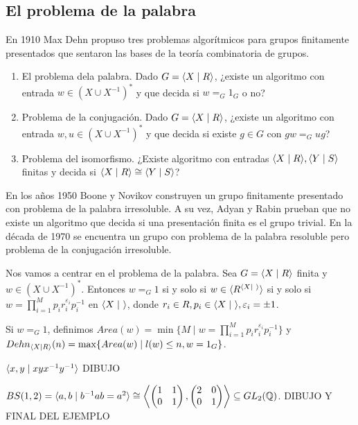 \documentclass[twoside, 11pt]{article}
\begin{document}
\subsection{El problema de la palabra}
En 1910 Max Dehn propuso tres problemas algorítmicos para grupos finitamente presentados que sentaron las bases de la teoría combinatoria de grupos. 
\begin{enumerate}
\item El problema dela palabra. Dado $G=\langle{X\mid R}\rangle$, ¿existe un algoritmo con entrada $w\in (X\cup X^{-1})^*$ y que decida si $w=_G1_G$ o no?
\item Problema de la conjugación. Dado $G=\langle{X\mid R}\rangle$, ¿existe un algoritmo con entrada $w,u\in (X\cup X^{-1})^*$ y que decida si existe $g\in G$ con $gw=_G ug$?
\item Problema del isomorfismo. ¿Existe algoritmo con entradas $\langle{X\mid R}\rangle, \langle{Y\mid S}\rangle$ finitas y decida si $\langle{X\mid R}\rangle\cong \langle{Y\mid S}\rangle$?
\end{enumerate}

En los años 1950 Boone y Novikov construyen un grupo finitamente presentado con problema de la palabra irresoluble. A su vez, Adyan y Rabin prueban que no existe un algoritmo que decida si una presentación finita es el grupo trivial. En la década de 1970 se encuentra un grupo con problema de la palabra resoluble pero problema de la conjugación irresoluble. 

Nos vamos a centrar en el problema de la palabra. Sea $G=\langle{X\mid R}\rangle$ finita y $w\in (X\cup X^{-1})^*$. Entonces $w=_G 1$ si y solo si $w\in \gene{R^{\gene{X\mid\ }}}$ si y solo si $w=\displaystyle\prod_{i=1}^M p_ir_i^{\varepsilon_i}p_i^{-1}$ en $\langle{X\mid\ }\rangle$, donde $r_i\in R, p_i\in\langle{X\mid\ }\rangle, \varepsilon_i=\pm 1$.

Si $w=_G 1$, definimos $Area(w)=\min\{M\mid w=\prod_{i=1}^M p_ir_i^{\varepsilon_i}p_i^{-1}\}$ y $Dehn_{\langle{X\mid R}\rangle}(n)=\max\{Area(w)\mid l(w)\leq n, w=1_G\}$.

\begin{ej}
$\langle{x,y\mid xyx^{-1}y^{-1}}\rangle$ DIBUJO
\end{ej}

\begin{ej}
$BS(1,2)=\langle{a,b\mid b^{-1}ab=a^2}\rangle\cong\left\langle\begin{pmatrix}
1 & 1\\
0 & 1
\end{pmatrix}, \begin{pmatrix}
2 & 0 \\
0 & 1
\end{pmatrix}\right\rangle\subseteq GL_2(\mathbb{Q})$. DIBUJO Y FINAL DEL EJEMPLO
\end{ej}
\end{document}
